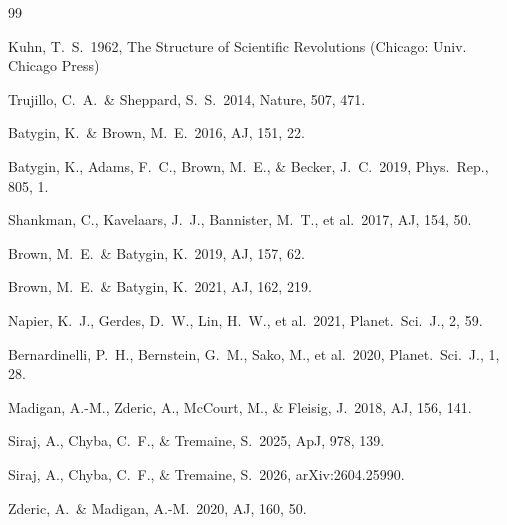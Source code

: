 \documentclass[12pt,a4paper]{article}
\begin{document}
\begin{thebibliography}{99}

 Kuhn, T.\ S.\ 1962, The Structure of Scientific Revolutions (Chicago: Univ. Chicago Press)

 Trujillo, C.\ A.\ \& Sheppard, S.\ S.\ 2014, Nature, 507, 471.

 Batygin, K.\ \& Brown, M.\ E.\ 2016, AJ, 151, 22.

 Batygin, K., Adams, F.\ C., Brown, M.\ E., \& Becker, J.\ C.\ 2019, Phys.\ Rep., 805, 1.

 Shankman, C., Kavelaars, J.\ J., Bannister, M.\ T., et al.\ 2017, AJ, 154, 50.

 Brown, M.\ E.\ \& Batygin, K.\ 2019, AJ, 157, 62.

 Brown, M.\ E.\ \& Batygin, K.\ 2021, AJ, 162, 219.

 Napier, K.\ J., Gerdes, D.\ W., Lin, H.\ W., et al.\ 2021, Planet.\ Sci.\ J., 2, 59.

 Bernardinelli, P.\ H., Bernstein, G.\ M., Sako, M., et al.\ 2020, Planet.\ Sci.\ J., 1, 28.

 Madigan, A.-M., Zderic, A., McCourt, M., \& Fleisig, J.\ 2018, AJ, 156, 141.

 Siraj, A., Chyba, C.\ F., \& Tremaine, S.\ 2025, ApJ, 978, 139.

 Siraj, A., Chyba, C.\ F., \& Tremaine, S.\ 2026, arXiv:2604.25990.

 Zderic, A.\ \& Madigan, A.-M.\ 2020, AJ, 160, 50.

\end{thebibliography}
\end{document}
